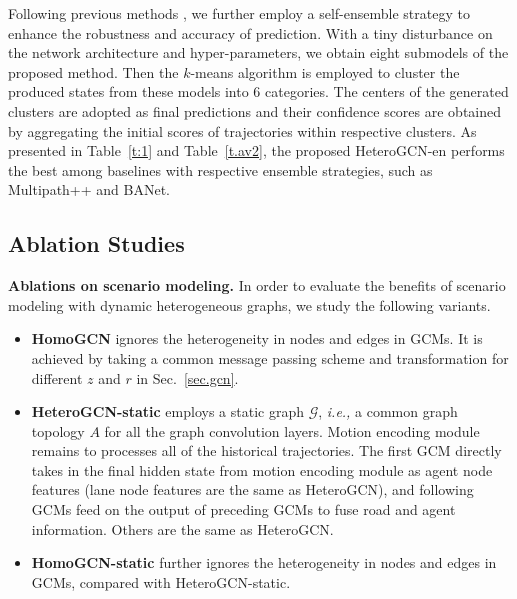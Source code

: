 \documentclass[letterpaper, 10 pt, conference]{ieeeconf}
\begin{document}
Following previous methods \cite{varadarajan2021multipath,DBLP:journals/corr/abs-2206-07934}, we further employ a self-ensemble strategy to enhance the robustness and accuracy of prediction. With a tiny  disturbance on the network architecture and hyper-parameters, we obtain eight submodels of the proposed method. Then the $k$-means algorithm is employed to cluster the produced states from these models into 6 categories.  The centers of the generated clusters are adopted as final predictions and their confidence scores are obtained by aggregating the initial scores of trajectories within respective clusters. As presented in Table~\ref{t:1} and Table~\ref{t.av2}, the proposed HeteroGCN-en performs the best among baselines with respective ensemble strategies, such as Multipath++ and BANet.

\subsection{Ablation Studies}
\textbf{Ablations on scenario modeling.} In order to evaluate the benefits of scenario modeling with dynamic heterogeneous graphs, we study the following variants.
\begin{itemize}
\item  \textbf{HomoGCN} ignores the heterogeneity in  nodes and edges in GCMs. It is achieved by taking a common message passing scheme and transformation for different $z$ and $r$ in Sec.~\ref{sec.gcn}.

\item  \textbf{HeteroGCN-static} employs a static graph $\mathcal{G}$, \textit{i.e.,} a common graph topology $A$ for all the graph convolution layers. Motion encoding module remains to processes all of the historical trajectories. 
The first GCM directly takes in the final hidden state from motion encoding module as agent node features (lane node features are the same as HeteroGCN), and following GCMs feed on the output of preceding GCMs to fuse road and agent information. Others are the same as HeteroGCN.

\item  \textbf{HomoGCN-static} further ignores the heterogeneity in nodes and edges in GCMs, compared with HeteroGCN-static. 
 \end{itemize}
\end{document}
